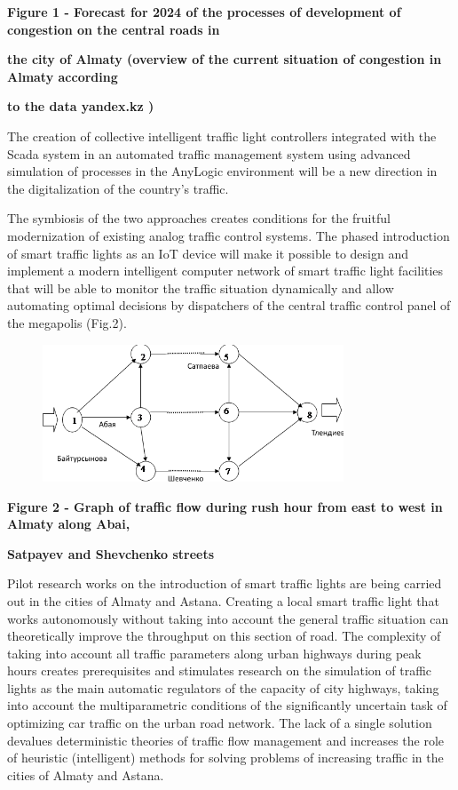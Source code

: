 \textbf{Figure 1 - Forecast for 2024 of the processes of development of
congestion on the central roads in}

\textbf{the city of Almaty (overview of the current situation of
congestion in Almaty according}

\textbf{to the data yandex.kz )}

The creation of collective intelligent traffic light controllers
integrated with the Scada system in an automated traffic management
system using advanced simulation of processes in the AnyLogic
environment will be a new direction in the digitalization of the
country's traffic.

The symbiosis of the two approaches creates conditions for the fruitful
modernization of existing analog traffic control systems. The phased
introduction of smart traffic lights as an IoT device will make it
possible to design and implement a modern intelligent computer network
of smart traffic light facilities that will be able to monitor the
traffic situation dynamically and allow automating optimal decisions by
dispatchers of the central traffic control panel of the megapolis
(Fig.2).

\begin{figure}[H]
	\centering
	\includegraphics[width=0.8\textwidth]{assets/74}
	\caption*{}
\end{figure}

\textbf{Figure 2 - Graph of traffic flow during rush hour from east to
west in Almaty along Abai,}

\textbf{Satpayev and Shevchenko streets}

Pilot research works on the introduction of smart traffic lights are
being carried out in the cities of Almaty and Astana. Creating a local
smart traffic light that works autonomously without taking into account
the general traffic situation can theoretically improve the throughput
on this section of road. The complexity of taking into account all
traffic parameters along urban highways during peak hours creates
prerequisites and stimulates research on the simulation of traffic
lights as the main automatic regulators of the capacity of city
highways, taking into account the multiparametric conditions of the
significantly uncertain task of optimizing car traffic on the urban road
network. The lack of a single solution devalues deterministic theories
of traffic flow management and increases the role of heuristic
(intelligent) methods for solving problems of increasing traffic in the
cities of Almaty and Astana.

